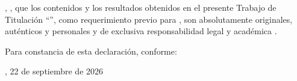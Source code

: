 
\UTIAutoresPronombre, \UTIAutoresTexto, \UTIVerboDeclaro{} que los contenidos y los resultados obtenidos en el presente Trabajo de Titulación ``\UTITituloProyecto'', como requerimiento previo para \UTIFraseObtencionTituloProfesional{}, son absolutamente originales, auténticos y personales y de exclusiva responsabilidad legal y académica \UTIAutoresResponsabilidad.

Para constancia de esta declaración, \UTIVerboFirmo{} conforme:

\vspace{1.5cm}

\UTICiudadPais, 22 de septiembre de 2026

\vspace{2cm}

\UTIFirmasAutoresBloque